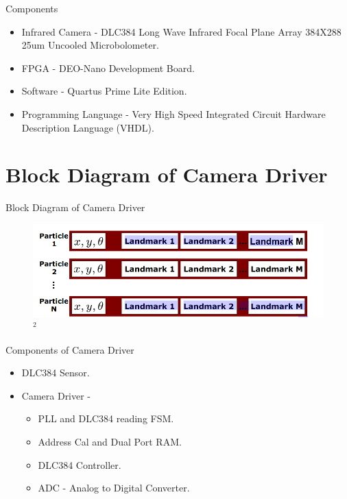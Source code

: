 \documentclass{beamer}
\begin{document}
\begin{frame}{Components}
    \begin{itemize}
        \item Infrared Camera - DLC384 Long Wave Infrared Focal Plane Array 384X288 25um Uncooled Microbolometer.
        \item FPGA - DEO-Nano Development Board.
        \item Software - Quartus Prime Lite Edition.
        \item Programming Language - Very High Speed Integrated Circuit Hardware Description Language (VHDL).
    \end{itemize}
\end{frame}


\section{Block Diagram of Camera Driver}
\begin{frame}{Block Diagram of Camera Driver}
    \begin{figure}[H]
        \centering
        \includegraphics[width=\textwidth]{RBPF_particles.png}$^{2}$
        \end{figure}
\end{frame}


\begin{frame}{Components of Camera Driver}
    \begin{itemize}
        \item DLC384 Sensor.
        \item Camera Driver - 
        \begin{itemize}
            \item PLL and DLC384 reading FSM.
            \item Address Cal and Dual Port RAM.
            \item DLC384 Controller.
            \item ADC - Analog to Digital Converter.
        \end{itemize}
    \end{itemize}
\end{frame}
\end{document}
